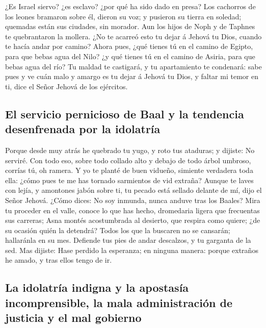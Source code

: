  ¿Es Israel siervo? ¿es esclavo? ¿por qué ha sido dado en
presa?  Los cachorros de los leones bramaron sobre él,
dieron su voz; y pusieron su tierra en soledad; quemadas están sus
ciudades, sin morador.  Aun los hijos de Noph y de Taphnes
te quebrantaron la mollera.  ¿No te acarreó esto tu dejar á
Jehová tu Dios, cuando te hacía andar por camino?  Ahora
pues, ¿qué tienes tú en el camino de Egipto, para que bebas agua del
Nilo? ¿y qué tienes tú en el camino de Asiria, para que bebas agua del
río?  Tu maldad te castigará, y tu apartamiento te
condenará: sabe pues y ve cuán malo y amargo es tu dejar á Jehová tu
Dios, y faltar mi temor en ti, dice el Señor Jehová de los ejércitos.

\hypertarget{el-servicio-pernicioso-de-baal-y-la-tendencia-desenfrenada-por-la-idolatruxeda}{%
\subsection{El servicio pernicioso de Baal y la tendencia desenfrenada
por la
idolatría}\label{el-servicio-pernicioso-de-baal-y-la-tendencia-desenfrenada-por-la-idolatruxeda}}

 Porque desde muy atrás he quebrado tu yugo, y roto tus
ataduras; y dijiste: No serviré. Con todo eso, sobre todo collado alto y
debajo de todo árbol umbroso, corrías tú, oh ramera.  Y yo
te planté de buen vidueño, simiente verdadera toda ella: ¿cómo pues te
me has tornado sarmientos de vid extraña?  Aunque te laves
con lejía, y amontones jabón sobre ti, tu pecado está sellado delante de
mí, dijo el Señor Jehová.  ¿Cómo dices: No soy inmunda,
nunca anduve tras los Baales? Mira tu proceder en el valle, conoce lo
que has hecho, dromedaria ligera que frecuentas sus carreras;
 Asna montés acostumbrada al desierto, que respira como
quiere; ¿de su ocasión quién la detendrá? Todos los que la buscaren no
se cansarán; hallaránla en su mes.  Defiende tus pies de
andar descalzos, y tu garganta de la sed. Mas dijiste: Hase perdido la
esperanza; en ninguna manera: porque extraños he amado, y tras ellos
tengo de ir.

\hypertarget{la-idolatruxeda-indigna-y-la-apostasuxeda-incomprensible-la-mala-administraciuxf3n-de-justicia-y-el-mal-gobierno}{%
\subsection{La idolatría indigna y la apostasía incomprensible, la mala
administración de justicia y el mal
gobierno}\label{la-idolatruxeda-indigna-y-la-apostasuxeda-incomprensible-la-mala-administraciuxf3n-de-justicia-y-el-mal-gobierno}}

